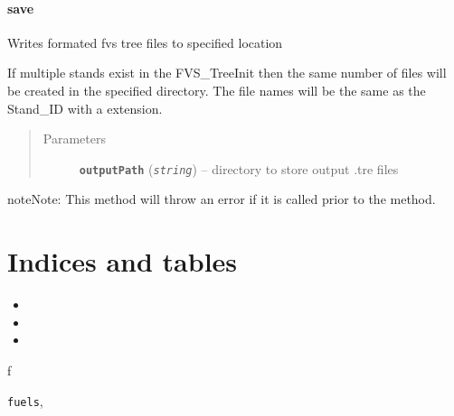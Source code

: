 \documentclass[letterpaper,10pt,english]{sphinxmanual}
\begin{document}
\subsubsection{save}
\label{Inventory:save}

\begin{fulllineitems}
\label{Inventory:fuels.Inventory.save}
Writes formated fvs tree files to specified location

If multiple stands exist in the FVS\_TreeInit then the same number of
files will be created in the specified directory.  The file names
will be the same as the Stand\_ID with a  extension.
\begin{quote}\begin{description}
\item[{Parameters}] \leavevmode
\textbf{\texttt{outputPath}} (\emph{\texttt{string}}) -- directory to store output .tre files

\end{description}\end{quote}

\begin{notice}{note}{Note:}
This method will throw an error if it is called prior to the
 method.
\end{notice}

\end{fulllineitems}



\chapter{Indices and tables}
\label{index:indices-and-tables}\begin{itemize}
\item {} 

\item {} 

\item {} 

\end{itemize}


\renewcommand{\indexname}{Python Module Index}
\begin{theindex}
\def\bigletter#1{{\Large\sffamily#1}\nopagebreak\vspace{1mm}}
\bigletter{f}
\item {\texttt{fuels}}, \pageref{fuels:module-fuels}
\end{theindex}

\renewcommand{\indexname}{Index}
\printindex
\end{document}
